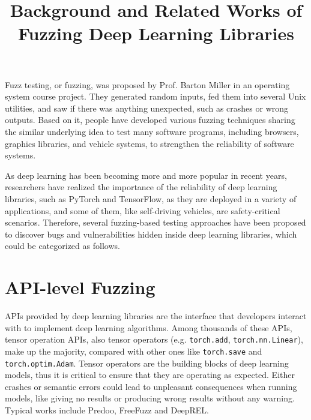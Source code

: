 
\begin{survey}
\label{cha:survey}

\title{Background and Related Works of Fuzzing Deep Learning Libraries}
\maketitle

\tableofcontents

Fuzz testing, or fuzzing, was proposed by Prof. Barton Miller in an operating system course project.\cite{fuzz_unix} They generated random inputs, fed them into several Unix utilities, and saw if there was anything unexpected, such as crashes or wrong outputs. Based on it, people have developed various fuzzing techniques sharing the similar underlying idea to test many software programs, including browsers\cite{corbfuzz}, graphics libraries\cite{fuzz_graphics}, and vehicle systems\cite{fuzz_vehicle}, to strengthen the reliability of software systems.

As deep learning has been becoming more and more popular in recent years, researchers have realized the importance of the reliability of deep learning libraries\cite{emp_tf}, such as PyTorch and TensorFlow, as they are deployed in a variety of applications, and some of them, like self-driving vehicles, are safety-critical scenarios. Therefore, several fuzzing-based testing approaches\cite{predoo, freefuzz, deeprel, cradle, lemon, graphfuzzer, muffin, nnsmith} have been proposed to discover bugs and vulnerabilities hidden inside deep learning libraries, which could be categorized as follows.

\section{API-level Fuzzing}

APIs provided by deep learning libraries are the interface that developers interact with to implement deep learning algorithms. Among thousands of these APIs, tensor operation APIs, also tensor operators (e.g. \texttt{torch.add}, \texttt{torch.nn.Linear}), make up the majority, compared with other ones like \texttt{torch.save} and \texttt{torch.optim.Adam}. Tensor operators are the building blocks of deep learning models, thus it is critical to ensure that they are operating as expected. Either crashes or semantic errors could lead to unpleasant consequences when running models, like giving no results or producing wrong results without any warning. Typical works include Predoo\cite{predoo}, FreeFuzz\cite{freefuzz} and DeepREL\cite{deeprel}.


\end{survey}
